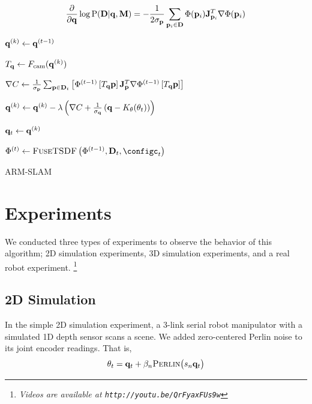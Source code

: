 \begin{equation}
	\frac{\partial}{\partial \mathbf{q}} \log \text{P}(\mathbf{D} | \mathbf{q}, \mathbf{M}) = -\frac{1}{2 \sigma_{\mathbf{p}}} \sum_{\mathbf{p}_i \in \mathbf{D}}\Phi(\mathbf{p}_i)\mathbf{J}_{\mathbf{p}_i}^{T} \nabla \Phi(\mathbf{p}_i)
\end{equation}


\begin{algorithm}


$\mathbf{q}^{(k)} \gets \mathbf{q}^{(t - 1)}$

{
    $T_{\mathbf{q}} \gets F_{\text{cam}}(\mathbf{q}^{(k)})$
    
	$\nabla C \gets  \frac{1}{\sigma_{\mathbf{p}}}\sum_{\mathbf{p} \in \mathbf{D}_t} \left[\Phi^{(t - 1)}\left[T_{\mathbf{q}} \mathbf{p}\right] \mathbf{J}_{\mathbf{p}}^T\nabla \Phi^{(t - 1)}\left[T_{\mathbf{q}} \mathbf{p}\right]\right]$
	
	$\mathbf{q}^{(k)} \gets \mathbf{q}^{(k)} - \lambda\left(\nabla C  + \frac{1}{\sigma_{\mathbf{q}}}\left(\mathbf{q} - K_\theta(\theta_t)\right)\right)$
}

$\mathbf{q}_t \gets \mathbf{q}^{(k)}$

$\Phi^{(t)} \gets \textsc{FuseTSDF}\left(\Phi^{(t - 1)}, \DepthImage_t, \configc_t\right)$
 
\caption{ARM-SLAM}
\label{alg:artfu}
\end{algorithm}

\section{Experiments}
\label{sec:experiments}
 
We conducted three types of experiments to observe the behavior of this algorithm; 2D simulation experiments, 3D simulation experiments, and a real robot experiment. \footnote{\textit{Videos are available at \texttt{http://youtu.be/QrFyaxFUs9w}}}

\subsection{2D Simulation}
\label{sec:2D_sim}
In the simple 2D simulation experiment, a 3-link serial robot manipulator with a simulated 1D depth sensor scans a scene. We added zero-centered Perlin \cite{Perlin02} noise to its joint encoder readings. That is,
\begin{equation}
\theta_t = \mathbf{q}_t + \beta_n\textsc{Perlin}\big(s_n \mathbf{q}_t\big)
\end{equation}

